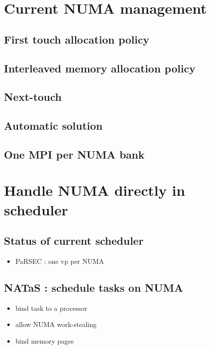 \documentclass[oneside,12t]{classes/Thesis}
\begin{document}
\section{Current NUMA management}
\subsection{First touch allocation policy}
\subsection{Interleaved memory allocation policy}
\subsection{Next-touch}
\subsection{Automatic solution}
\subsection{One MPI per NUMA bank}


\section{Handle NUMA directly in scheduler}
\subsection{Status of current scheduler}
  \begin{itemize}
    \item PaRSEC : one vp per NUMA
  \end{itemize}
\subsection{NATaS : schedule tasks on NUMA}
  \begin{itemize}
    \item bind task to a processor
    \item allow NUMA work-stealing
    \item bind memory pages
  \end{itemize}
\end{document}
